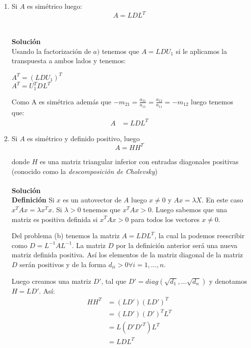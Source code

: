 \begin{enumerate}
    \item Si $A$ es simétrico luego:
    $$
    A = LDL^T
    $$\\\\
    
    \textbf{Solución}\\
    Usando la factorización de $a)$ tenemos que $A = LDU_1$ si le aplicamos la transpuesta a ambos lados y tenemos:
    
    \begin{center}
            $A^T = (LDU_1)^T$\\
            $A^T = U_1^T DL^T$\\
   \end{center}

\textrm{Como A es simétrica además que $-m_{21} = \frac{a_{21}}{a_{11}} = \frac{a_{12}}{a_{11}}= -m_{12}$ luego tenemos que:}\\
    
    \begin{equation*}
        \begin{split}
            A &= LDL^T
        \end{split}
    \end{equation*}
    
    \item Si $A$ es simétrico y definido positivo, luego
    $$
    A = HH^T
    $$
    
    donde $H$ es una matriz triangular inferior con entradas diagonales positivas (conocido como la \textit{descomposición de Cholevsky})\\\\
    \textbf{Solución}\\
    
    \textbf{Definición}
    Si $x$ es un autovector de $A$ luego $x \neq 0$ y $A x = \lambda X$. En este caso $x^TAx = \lambda x^T x$. Si $\lambda > 0$ tenemos que $x^T A x > 0$. Luego sabemos que una matriz es positiva definida si $x^TAx > 0$ para todos los vectores $x \neq 0$.
    
    Del problema (b) tenemos la matriz $A = LDL^T$, la cual la podemos reescribir como $D = L^{-1}AL^{-1}$. La matriz $D$ por la definición anterior será una nueva matriz definida positiva. Así los elementos de la matriz diagonal de la matriz $D$ serán positivos y de la forma $d_{ii} > 0 \forall i = 1, \ldots, n$.
    
    Luego creamos una matriz $D'$, tal que $D' = diag(\sqrt{d_1}, \ldots \sqrt{d_n})$ y denotamos $H = LD'$. Así:
    \begin{equation*}
        \begin{split}
            H H^T &= (L D')(L D')^T\\
            &= (L D')(D')^T L^T\\
            &= L(D'D'^T)L^T\\
            &= L D L ^T
        \end{split}
    \end{equation*}
\end{enumerate}